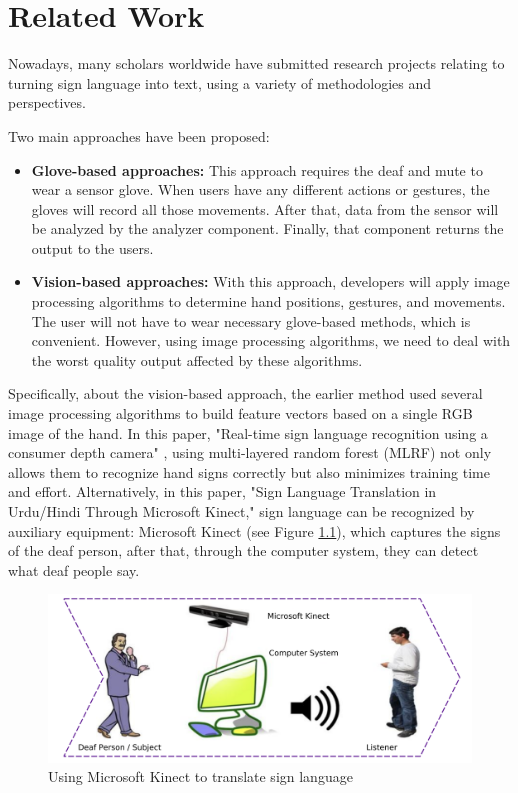 \chapter{Related Work}

Nowadays, many scholars worldwide have submitted research projects relating to turning sign language into text, using a variety of methodologies and perspectives.

Two main approaches have been proposed:
\begin{itemize}
  \item \textbf{Glove-based approaches:} This approach requires the deaf and mute to wear a sensor glove. When users have any different actions or gestures, the gloves will record all those movements. After that, data from the sensor will be analyzed by the analyzer component. Finally, that component returns the output to the users.
  \item \textbf{Vision-based approaches:} With this approach, developers will apply image processing algorithms to determine hand positions, gestures, and movements. The user will not have to wear necessary glove-based methods, which is convenient. However, using image processing algorithms, we need to deal with the worst quality output affected by these algorithms.
\end{itemize}

Specifically, about the vision-based approach, the earlier method used several image processing algorithms to build feature vectors based on a single RGB image of the hand. In this paper, "Real-time sign language recognition using a consumer depth camera" \cite{kuznetsova2013real}, using multi-layered random forest (MLRF) not only allows them to recognize hand signs correctly but also minimizes training time and effort. Alternatively, in this paper, "Sign Language Translation in Urdu/Hindi Through Microsoft Kinect," sign language can be recognized by auxiliary equipment: Microsoft Kinect (see Figure \ref{fig:Chap2-MS-Kinect}), which captures the signs of the deaf person, after that, through the computer system, they can detect what deaf people say.

\begin{figure}[H]
  \centering
  \includegraphics[width=\textwidth]{img/Chap2/MS-Kinect.png}
  \caption{Using Microsoft Kinect to translate sign language}
  \label{fig:Chap2-MS-Kinect}
\end{figure}

